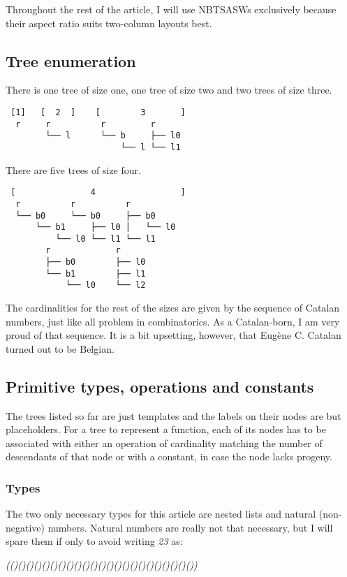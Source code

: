 \documentclass[12pt,twocolumn]{article}
\begin{document}
Throughout the rest of the article, I will use NBTSASWs exclusively because their aspect ratio suits two-column layouts best.

\subsection{Tree enumeration}
There is one tree of size one, one tree of size two and two trees of size three.

\begin{verbatim}
 [1]   [  2  ]    [        3       ]
  r     r          r         r
        └── l      └── b     ├── l0
                       └── l └── l1
\end{verbatim}

There are five trees of size four.
\begin{verbatim}
 [               4                 ]
  r          r          r         
  └── b0     └── b0     ├── b0    
      └── b1     ├── l0 │   └── l0
          └── l0 └── l1 └── l1    
        r             r
        ├── b0        ├── l0
        └── b1        ├── l1
            └── l0    └── l2
\end{verbatim}

The cardinalities for the rest of the sizes are given by the sequence of Catalan numbers, just like all problem in combinatorics\cite{RPStanley2001}. As a Catalan-born, I am very proud of that sequence. It is a bit upsetting, however, that Eugène C. Catalan turned out to be Belgian.

\subsection{Primitive types, operations and constants}\label{subsec_primitives}
The trees listed so far are just templates and the labels on their nodes are but placeholders. For a tree to represent a function, each of its nodes has to be associated with either an operation of cardinality matching the number of descendants of that node or with a constant, in case the node lacks progeny. 

\subsubsection{Types}
The two only necessary types for this article are nested lists and natural (non-negative) numbers. Natural numbers are really not that necessary, but I will spare them if only to avoid writing \emph{23} as:

\emph{(()()()()()()()()()()()()()()()()()()()()()()())}
\end{document}
